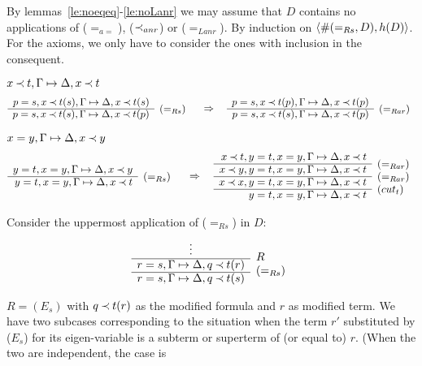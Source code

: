 \begin{PROOF}
By lemmas~\ref{le:noeqeq}-\ref{le:noLanr} we may assume that $D$ contains no
applications of ($=_{a=}$), ($\mathbin{\prec}_{anr}$) or ($=_{Lanr}$).
By induction on $\langle\#(=_{Rs},D),h(D)\rangle$.
For the axioms, we only have to consider the ones with inclusion in the consequent.
\begin{LS}
\item $x\mathbin{\prec} t,\Gamma\mathrel{\mapsto}\Delta,x\mathbin{\prec} t$
\[
\begin{array}{rl}
p=s, x\Incl t(s),\GSD,x\Incl t(s) \\ \cline{1-1}
p=s, x\Incl t(s),\GSD,x\Incl t(p) & \rabove{(=_{Rs})}
\end{array}
\conv
\begin{array}{rl}
p=s, x\Incl t(p),\GSD,x\Incl t(p) \\ \cline{1-1}
p=s, x\Incl t(s),\GSD,x\Incl t(p) & \rabove{(=_{Rar})}
\end{array}
\]
\item $x=y,\Gamma\mathrel{\mapsto}\Delta,x\mathbin{\prec} y$
\[
\begin{array}{rl}
y=t, x=y,\GSD,x\Incl y \\ \cline{1-1}
y=t, x=y,\GSD,x\Incl t & \rabove{(=_{Rs})}
\end{array}
\conv
\begin{array}{rl}
x\Incl t,y=t, x=y,\GSD,x\Incl t\\ \cline{1-1}
x\Incl y, y=t, x=y,\GSD,x\Incl t & \rabove{(=_{Rar})} \\ \cline{1-1}
x\Incl x, y=t, x=y,\GSD,x\Incl t & \rabove{(=_{Rar})} \\ \cline{1-1}
y=t, x=y,\GSD,x\Incl t & \rabove{(cut_{t})}
\end{array}
\]
\end{LS}
Consider the uppermost application of ($=_{Rs}$) in $D$:
\[ \begin{array}{cl}
\vdots          & \raisebox{-1.2ex}[1.5ex][0ex]{$R$} \\ \cline{1-1}
r=s, \Gamma\Seq\Delta, q\Incl t(r) &
\raisebox{-1.2ex}[1.5ex][0ex]{($=_{Rs}$)} \\ \cline{1-1}
r=s, \Gamma\Seq\Delta, q\Incl t(s) 
\end{array} \]
\begin{LS}
\item\label{it:RsEs} $R=(E_s)$ with $q\mathbin{\prec} t(r)$ as the modified formula and $r$ as
modified term. We have two subcases corresponding to the situation when the
term $r'$ substituted by ($E_s$) for its eigen-variable is a subterm or
superterm of (or equal to) $r$. (When the two are independent, the case is

\end{LS}
\end{PROOF}
